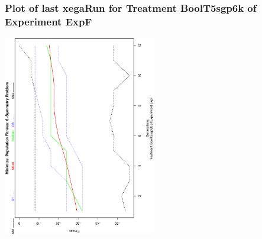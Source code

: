  \begin{frame}
 \frametitle{ Plot of last xegaRun for Treatment BoolT5sgp6k of Experiment ExpF }
 \begin{center}
\includegraphics[width=0.5\textwidth, angle=-90]
{ExpFPlotPopStatsFigure007.eps}
 \end{center}
 \label{report/ExpFPlotPopStatsFigure007.eps}  
 \end{frame}

